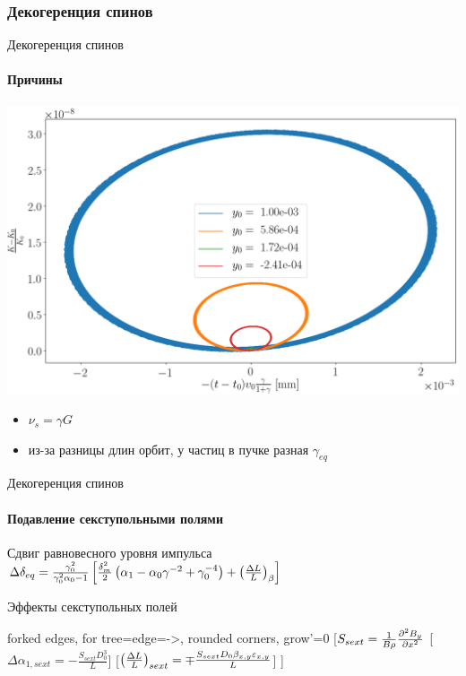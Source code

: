 \documentclass[14pt]{beamer}
\begin{document}
\begin{frame}\frametitle{Декогеренция спинов}%
	\centering
\end{frame}
\begin{frame}{Декогеренция спинов}
	\framesubtitle{Причины}
	\begin{minipage}{.65\linewidth}
		\includegraphics[width=\linewidth]{chapter1/psp_diagram_betatron}
	\end{minipage}%
	\begin{minipage}{.4\linewidth}
		\begin{itemize}
			\item $\nu_s = \gamma G$
			\item из-за разницы длин орбит, у частиц в пучке разная $\gamma_{eq}$ 
		\end{itemize}
	\end{minipage}
\end{frame}
\begin{frame}{Декогеренция спинов}
	\framesubtitle{Подавление секступольными полями}
	\begin{block}{Сдвиг равновесного уровня импульса}
		$\Delta\delta_{eq} = \frac{\gamma_0^2}{\gamma_0^2\alpha_0 - 1}\bkt*{\frac{\delta_m^2}{2}\bkt{\alpha_1 - \alpha_0\gamma^{-2} + \gamma_0^{-4}} + \bkt{\frac{\Delta L}{L}}_\beta}$
	\end{block}
	\begin{block}{Эффекты секступольных полей}
		\begin{forest}
			forked edges,
			for tree={edge={->},  rounded corners, grow'=0}
			[{$S_{sext} = \frac{1}{B\rho} \pddx{B_y}[x][2]$}
			[{$\Delta \alpha_{1,sext} = -\frac{S_{sext}D_0^3}{L}$}]
			[{$\bkt{\frac{\Delta L}{L}}_{sext} = \mp \frac{S_{sext}D_0\beta_{x,y}\varepsilon_{x,y}}{L}$}]
			]
		\end{forest}
	\end{block}
\end{frame}
\end{document}
